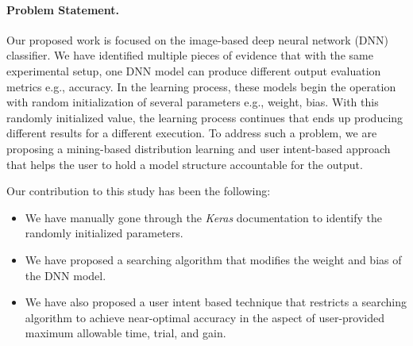 \paragraph{Problem Statement. }
Our proposed work is focused on the image-based deep neural network (DNN) classifier. We have identified multiple pieces of evidence that with the same experimental setup, one DNN model can produce different output evaluation metrics e.g., accuracy. In the learning process, these models begin the operation with random initialization of several parameters e.g., weight, bias. With this randomly initialized value, the learning process continues that ends up producing different results for a different execution. To address such a problem, we are proposing a mining-based distribution learning and 
user intent-based approach that helps the user to hold a model structure accountable for the output.


Our contribution to this study has been the following:
\begin{itemize}
    \item We have manually gone through the \emph{Keras} documentation to identify the randomly initialized parameters.
\item We have proposed a searching algorithm that modifies the weight and bias of the DNN model.
\item We have also proposed a user intent based technique that restricts a searching algorithm to achieve near-optimal accuracy in the aspect of user-provided maximum allowable time, trial, and gain.
\end{itemize}

